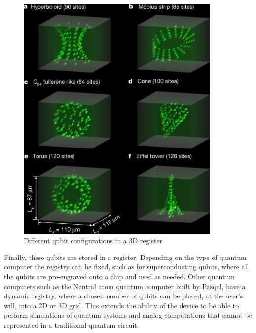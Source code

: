 \begin{figure}
  \centering
  \includegraphics[width=100mm]{./Images/register3D.png}
  \caption{Different qubit configurations in a 3D register} 
  \label{fig:3d register}

\end{figure}
Finally, these qubits are stored in a register. Depending on the type of quantum computer the registry can be fixed, such as for superconducting qubits, where all the qubits 
are pre-engraved onto a chip and used as needed. Other quantum computers such as the Neutral atom quantum computer built by Pasqal, have a dynamic registry, where a chosen
number of qubits can be placed, at the user's will, into a 2D or 3D grid. This extends the ability of the device to be able to perform simulations of quantum systems and analog
computations that cannot be represented in a traditional quantum circuit.
\\ \\ \\ \\ \\ \\ \\ \\

